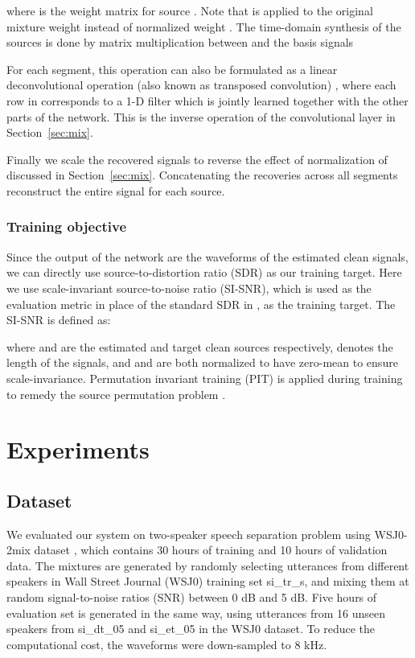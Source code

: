 \documentclass{article}
\begin{document}
where  is the weight matrix for source . Note that  is applied to the original mixture weight  instead of normalized weight . The time-domain synthesis of the sources is done by matrix multiplication between  and the basis signals 


For each segment, this operation can also be formulated as a linear deconvolutional operation (also known as transposed convolution) \cite{dumoulin2016guide}, where each row in  corresponds to a 1-D filter which is jointly learned together with the other parts of the network. This is the inverse operation of the convolutional layer in Section~\ref{sec:mix}.

Finally we scale the recovered signals to reverse the effect of  normalization of  discussed in Section~\ref{sec:mix}. Concatenating the recoveries across all segments reconstruct the entire signal for each source.



\subsubsection{Training objective}
\label{sec:obj}

Since the output of the network are the waveforms of the estimated clean signals, we can directly use source-to-distortion ratio (SDR) as our training target. Here we use scale-invariant source-to-noise ratio (SI-SNR), which is used as the evaluation metric in place of the standard SDR in \cite{isik2016single, chen2017deep}, as the training target. The SI-SNR is defined as:

where  and  are the estimated and target clean sources respectively,  denotes the length of the signals, and  and  are both normalized to have zero-mean to ensure scale-invariance. Permutation invariant training (PIT) \cite{kolbaek2017multitalker} is applied during training to remedy the source permutation problem \cite{isik2016single, kolbaek2017multitalker, chen2017deep}. 
\section{Experiments}
\label{sec:exp}

\subsection{Dataset}

We evaluated our system on two-speaker speech separation problem using WSJ0-2mix dataset \cite{isik2016single, kolbaek2017multitalker, chen2017deep}, which contains 30 hours of training and 10 hours of validation data. The mixtures are generated by randomly selecting utterances from different speakers in Wall Street Journal (WSJ0) training set si\_tr\_s, and mixing them at random signal-to-noise ratios (SNR) between 0 dB and 5 dB. Five hours of evaluation set is generated in the same way, using utterances from 16 unseen speakers from si\_dt\_05 and si\_et\_05 in the WSJ0 dataset. To reduce the computational cost, the waveforms were down-sampled to 8 kHz.
\end{document}
